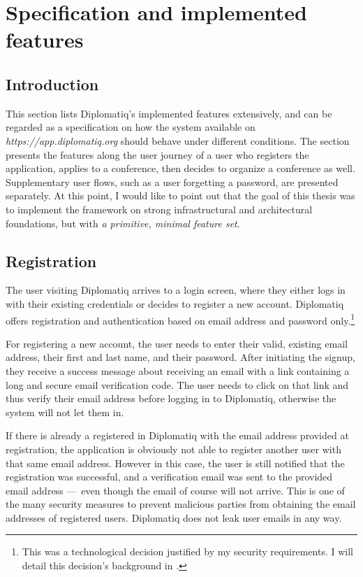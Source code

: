 \section{Specification and implemented features}
\label{section:specification}

\subsection{Introduction}

This section lists Diplomatiq's implemented features extensively, and can be regarded as a specification on how the system available on \emph{https://app.diplomatiq.org} should behave under different conditions. The section presents the features along the user journey of a user who registers the application, applies to a conference, then decides to organize a conference as well. Supplementary user flows, such as a user forgetting a password, are presented separately. At this point, I would like to point out that the goal of this thesis was to implement the framework on strong infrastructural and architectural foundations, but with \emph{a primitive, minimal feature set}.

\subsection{Registration}

The user visiting Diplomatiq arrives to a login screen, where they either logs in with their existing credentials or decides to register a new account. Diplomatiq offers registration and authentication based on email address and password only.\footnote{This was a technological decision justified by my security requirements. I will detail this decision's background in .}

For registering a new account, the user needs to enter their valid, existing email address, their first and last name, and their password. After initiating the signup, they receive a success message about receiving an email with a link containing a long and secure email verification code. The user needs to click on that link and thus verify their email address before logging in to Diplomatiq, otherwise the system will not let them in.

If there is already a registered in Diplomatiq with the email address provided at registration, the application is obviously not able to register another user with that same email address. However in this case, the user is still notified that the registration was successful, and a verification email was sent to the provided email address — even though the email of course will not arrive. This is one of the many security measures to prevent malicious parties from obtaining the email addresses of registered users. Diplomatiq does not leak user emails in any way.

